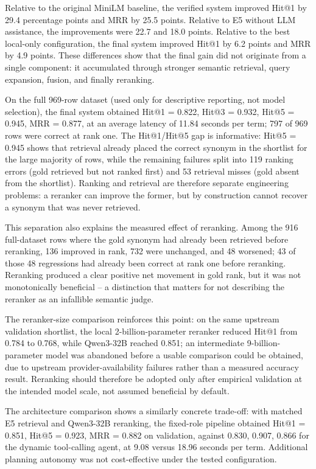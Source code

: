 Relative to the original MiniLM baseline, the verified system improved Hit@1 by 29.4 percentage points and MRR by 25.5 points. Relative to E5 without LLM assistance, the improvements were 22.7 and 18.0 points. Relative to the best local-only configuration, the final system improved Hit@1 by 6.2 points and MRR by 4.9 points. These differences show that the final gain did not originate from a single component: it accumulated through stronger semantic retrieval, query expansion, fusion, and finally reranking.

On the full 969-row dataset (used only for descriptive reporting, not model selection), the final system obtained Hit@1 = 0.822, Hit@3 = 0.932, Hit@5 = 0.945, MRR = 0.877, at an average latency of 11.84 seconds per term; 797 of 969 rows were correct at rank one. The Hit@1/Hit@5 gap is informative: Hit@5 = 0.945 shows that retrieval already placed the correct synonym in the shortlist for the large majority of rows, while the remaining failures split into 119 ranking errors (gold retrieved but not ranked first) and 53 retrieval misses (gold absent from the shortlist). Ranking and retrieval are therefore separate engineering problems: a reranker can improve the former, but by construction cannot recover a synonym that was never retrieved.

This separation also explains the measured effect of reranking. Among the 916 full-dataset rows where the gold synonym had already been retrieved before reranking, 136 improved in rank, 732 were unchanged, and 48 worsened; 43 of those 48 regressions had already been correct at rank one before reranking. Reranking produced a clear positive net movement in gold rank, but it was not monotonically beneficial -- a distinction that matters for not describing the reranker as an infallible semantic judge.

The reranker-size comparison reinforces this point: on the same upstream validation shortlist, the local 2-billion-parameter reranker reduced Hit@1 from 0.784 to 0.768, while Qwen3-32B reached 0.851; an intermediate 9-billion-parameter model was abandoned before a usable comparison could be obtained, due to upstream provider-availability failures rather than a measured accuracy result. Reranking should therefore be adopted only after empirical validation at the intended model scale, not assumed beneficial by default.

The architecture comparison shows a similarly concrete trade-off: with matched E5 retrieval and Qwen3-32B reranking, the fixed-role pipeline obtained Hit@1 = 0.851, Hit@5 = 0.923, MRR = 0.882 on validation, against 0.830, 0.907, 0.866 for the dynamic tool-calling agent, at 9.08 versus 18.96 seconds per term. Additional planning autonomy was not cost-effective under the tested configuration.

